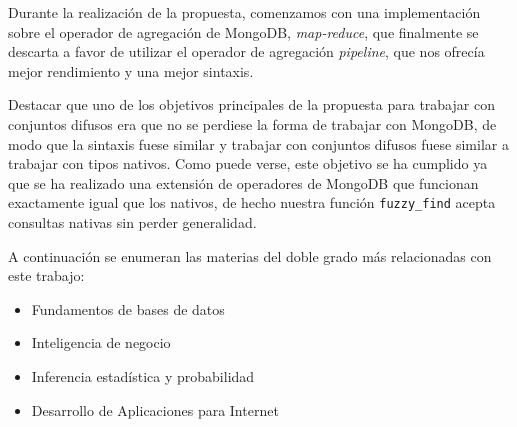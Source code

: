Durante la realización de la propuesta, comenzamos con una implementación sobre el operador de agregación de MongoDB, \textit{map-reduce}, que finalmente se descarta a favor de utilizar el operador de agregación \textit{pipeline}, que nos ofrecía mejor rendimiento y una mejor sintaxis.

Destacar que uno de los objetivos principales de la propuesta para trabajar con conjuntos difusos era que no se perdiese la forma de trabajar con MongoDB, de modo que la sintaxis fuese similar y trabajar con conjuntos difusos fuese similar a trabajar con tipos nativos. Como puede verse, este objetivo se ha cumplido ya que se ha realizado una extensión de operadores de MongoDB que funcionan exactamente igual que los nativos, de hecho nuestra función \texttt{fuzzy\_find} acepta consultas nativas sin perder generalidad.

A continuación se enumeran las materias del doble grado más relacionadas con este trabajo:
\begin{itemize}
    \item Fundamentos de bases de datos
    \item Inteligencia de negocio
    \item Inferencia estadística y probabilidad
    \item Desarrollo de Aplicaciones para Internet
\end{itemize}

\newpage
